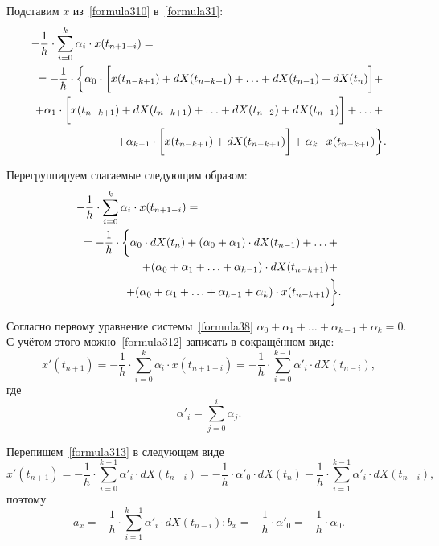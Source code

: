Подставим $x$ из~\eqref{formula310} в~\eqref{formula31}:
\begin{eqnarray}
\label{formula311}
-\frac 1 h \cdot \sum_{i=0}^{k}\alpha_i \cdot x(t_{n+1-i}) = \hphantom{aaaaaaaaaaaaaaaaaaaaaaaaaaaaaaaaaaaaaa} \nonumber ~\\
= -\frac 1 h \cdot \bigg\{\alpha_0 \cdot \bigg[ x(t_{n-k+1}) + dX(t_{n-k+1}) + \dots + dX(t_{n-1}) + dX(t_n) \bigg] + \nonumber ~\\ 
+ \alpha_1 \cdot \bigg[ x(t_{n-k+1}) + dX(t_{n-k+1}) + \dots + dX(t_{n-2}) + dX(t_{n-1}) \bigg] + \dots + \nonumber ~\\
+\alpha_{k-1} \cdot \bigg[ x(t_{n-k+1}) + dX(t_{n-k+1}) \bigg] + \alpha_k \cdot x(t_{n-k+1}) \bigg\}.
\end{eqnarray}

Перегруппируем слагаемые следующим образом:
\begin{eqnarray}
\label{formula312}
-\frac 1 h \cdot \sum_{i=0}^{k}\alpha_i \cdot x(t_{n+1-i}) = \hphantom{aaaaaaaaaaaaaaaaaaaaaaa} \nonumber ~\\
= -\frac 1 h \cdot \bigg\{\alpha_0 \cdot dX(t_n) + (\alpha_0 + \alpha_1)\cdot dX(t_{n-1}) + \dots + \nonumber ~\\
+(\alpha_0 + \alpha_1 + \dots + \alpha_{k-1})\cdot dX(t_{n-k+1}) + \nonumber ~\\
+(\alpha_0 + \alpha_1 + \dots + \alpha_{k-1} + \alpha_k)\cdot x(t_{n-k+1}) \bigg\}.
\end{eqnarray} 

Согласно первому уравнение системы~\eqref{formula38} $\alpha_0 + \alpha_1 + \dots + \alpha_{k-1} + \alpha_k=0$. С учётом этого можно~\eqref{formula312} записать в сокращённом виде:
\begin{equation}
\label{formula313}
x'(t_{n+1}) = -\frac 1 h \cdot \sum_{i=0}^{k}\alpha_i \cdot x(t_{n+1-i}) = -\frac 1 h \cdot \sum_{i=0}^{k-1} \alpha'_i \cdot dX(t_{n-i}), 
\end{equation}
где 
\begin{equation}
\label{formula314}
\alpha'_i = \sum_{j=0}^{i} \alpha_j.
\end{equation}

Перепишем~\eqref{formula313} в следующем виде
\begin{equation}
\label{formula315}
x'(t_{n+1}) = -\frac 1 h \cdot \sum_{i=0}^{k-1} \alpha'_i \cdot dX(t_{n-i}) = -\frac 1 h \cdot \alpha'_0 \cdot dX(t_n) -\frac 1 h \cdot \sum_{i=1}^{k-1} \alpha'_i \cdot dX(t_{n-i}),  
\end{equation} 
поэтому
\begin{equation}
\label{formula316}
a_x=-\frac 1 h \cdot \sum_{i=1}^{k-1} \alpha'_i \cdot dX(t_{n-i}); b_x=-\frac 1 h \cdot \alpha'_0=-\frac 1 h \cdot \alpha_0.
\end{equation}

